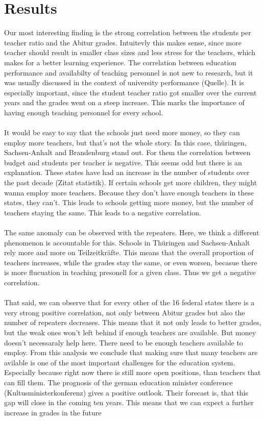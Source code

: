\section*{Results}
Our most interesting finding is the strong correlation between the students per teacher ratio and the Abitur grades. Intuitevly this makes sense, since more teacher should result in smaller class sizes and less stress for the teachers, which makes for a better learning experience. The correlation between education performance and availabilty of teaching personnel is not new to research, but it was usually discussed in the context of university performance (Quelle). It is especially important, since the student teacher ratio got smaller over the current years and the grades went on a steep increase. This marks the importance of having enough teaching personnel for every school.\\\\
It would be easy to say that the schools just need more money, so they can employ more teachers, but that's not the whole story. In this case, thüringen, Sachsen-Anhalt and Brandenburg stand out. For them the correlation between budget and students per teacher is negative. This seems odd but there is an explanation. These states have had an increase in the number of students over the past decade (Zitat statistik).  If certain schools get more children, they might wanna employ more teachers. Because they don't have enough teachers in these states, they can't. This leads to schools getting more money, but the number of teachers staying the same. This leads to a negative correlation.\\\\
The same anomaly can be observed with the repeaters. Here, we think a different phenomenon is accountable for this. Schools in Thüringen and Sachsen-Anhalt rely more and more on Teilzeitkräfte. This means that the overall proportion of teachers increases, while the grades stay the same, or even worsen, becasue there is more flucuation in teaching presonell for a given class. Thus we get a negative correlation.\\\\
That said, we can observe that for every other of the 16 federal states there is a very strong positive correlation, not only between Abitur grades but also the number of repeaters decreases. This means that it not only leads to better grades, but the weak ones won't left behind if enough teachers are available. But money doesn't necessaraly help here. There need to be enough teachers available to employ. From this analysis we conclude that making sure that many teachers are avilable is one of the most important challenges for the education system. Especially because right now there is still more open positions, than teachers that can fill them. The prognosis of the german education minister conference (Kultusministerkonferenz) gives a positive outlook. Their forecast is, that this gap will close in the coming ten years. This means that we can expect a further increase in grades in the future\\\\
